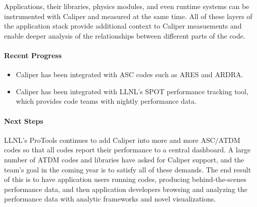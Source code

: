 Applications, their libraries, physics modules, and even runtime systems
can be instrumented with Caliper and measured at the same time.  All of
these layers of the application stack provide additional context to
Caliper measuements and enable deeper analysis of the relationships
between different parts of the code.

\paragraph{Recent Progress}

\begin{itemize}
\item Caliper has been integrated with ASC codes such as ARES and ARDRA.
\item Caliper has been integrated with LLNL's SPOT performance tracking tool,
      which provides code teams with nightly performance data.
\end{itemize}

\paragraph{Next Steps}

LLNL's ProTools continues to add Caliper into more and more ASC/ATDM
codes so that all codes report their performance to a central dashboard.
A large number of ATDM codes and libraries have asked for Caliper
support, and the team's goal in the coming year is to satisfy all of
these demands.  The end result of this is to have application users
running codes, producing behind-the-scenes performance data, and then
application developers browsing and analyzing the performance data with
analytic frameworks and novel visualizations.
